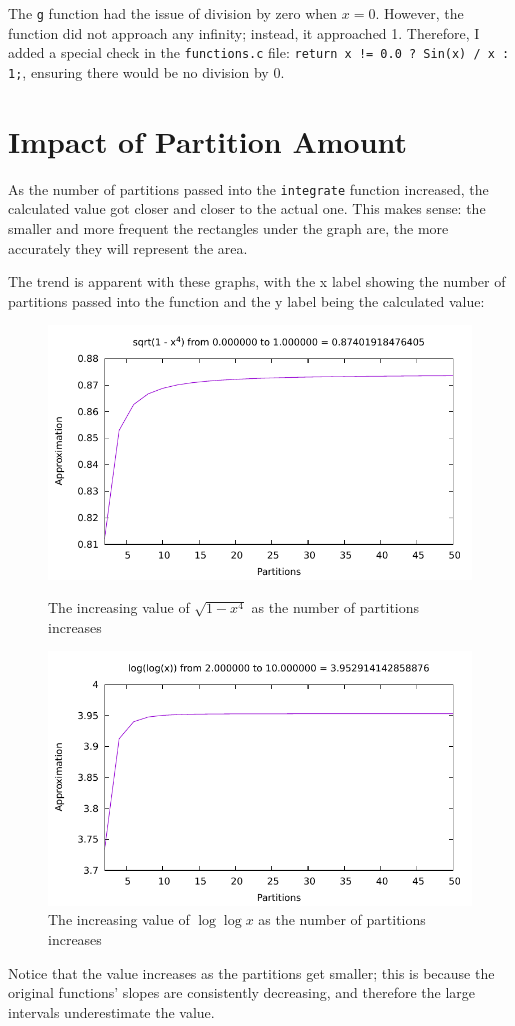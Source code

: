\documentclass[12pt]{article}
\begin{document}
The \verb|g| function had the issue of division by zero when $x = 0$. However, the function did not approach any infinity; instead, it approached 1. Therefore, I added a special check in the \verb|functions.c| file: \verb|return x != 0.0 ? Sin(x) / x : 1;|, ensuring there would be no division by 0.

\section{Impact of Partition Amount}

As the number of partitions passed into the \verb|integrate| function increased, the calculated value got closer and closer to the actual one. This makes sense: the smaller and more frequent the rectangles under the graph are, the more accurately they will represent the area.

The trend is apparent with these graphs, with the x label showing the number of partitions passed into the function and the y label being the calculated value:
\begin{figure}\begin{centering}
\includegraphics{integrate0.pdf}\caption{The increasing value of $\sqrt{1 - x^4}$ as the number of partitions increases}
\includegraphics{integrate5.pdf}\caption{The increasing value of $\log{\log{x}}$ as the number of partitions increases}
\end{centering}\end{figure}
\newpage
Notice that the value increases as the partitions get smaller; this is because the original functions' slopes are consistently decreasing, and therefore the large intervals underestimate the value.
\end{document}
